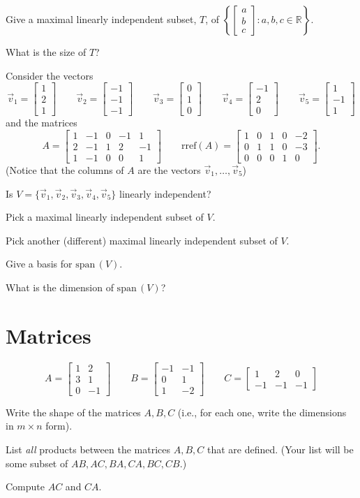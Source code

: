 \documentclass{problemset}
\newcommand{\R}{\mathbb{R}}
\newcommand{\Span}{\mathrm{span}\,}
\newcommand{\rref}{\mathrm{rref}}
\newcommand{\mat}[1]{\begin{bmatrix}#1\end{bmatrix}}
\begin{document}
	\question
	\begin{parts}
		\item Give a maximal linearly independent subset, $T$, of
		$\left\{\mat{a\\b\\c}:a,b,c\in \R\right\}$.
		\item What is the size of $T$?
	\end{parts}

	\question
	Consider the vectors
	\[
		\vec v_1=\mat{1\\2\\1}
		\qquad
		\vec v_2=\mat{-1\\-1\\-1}
		\qquad
		\vec v_3=\mat{0\\1\\0}
		\qquad
		\vec v_4=\mat{-1\\2\\0}
		\qquad
		\vec v_5=\mat{1\\-1\\1}
	\]
	and the matrices
	\[
		A=\mat{1&-1&0&-1&1\\ 2&-1&1&2&-1\\1 & -1&0&0&1}
		\qquad \rref (A)
		=\mat{1&0&1&0&-2\\0&1&1&0&-3\\0&0&0&1&0}.
	\]
	(Notice that the columns of $A$ are the vectors $\vec v_1,\ldots, \vec v_5$)

	\begin{parts}
		\item Is $V=\{\vec v_1,\vec v_2,\vec v_3,\vec v_4,\vec v_5\}$ linearly
		independent?
		\item Pick a maximal linearly independent subset of $V$.
		\item Pick another (different) maximal linearly independent subset of $V$.
		\item Give a basis for $\Span(V)$.
		\item What is the dimension of $\Span(V)$?
	\end{parts}

	\newpage
\section*{Matrices}
	\question
	\[
		A=\mat{1&2\\3&1\\0&-1}
		\qquad
		B=\mat{-1&-1\\0&1\\1&-2}
		\qquad
		C=\mat{1&2&0\\-1&-1&-1}
	\]
	\begin{parts}
		\item Write the shape of the matrices $A,B,C$ (i.e., for each one,
		write the dimensions in $m\times n$ form).
		\item List \emph{all} products between the matrices $A,B,C$ that are
		defined. (Your list will be some subset of $AB,AC,BA,CA,BC,CB$.)
		\item Compute $AC$ and $CA$.
	\end{parts}
\end{document}

